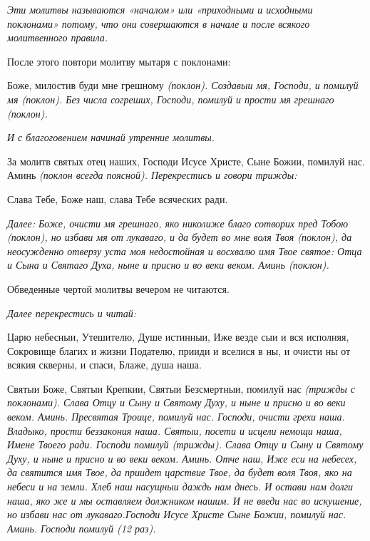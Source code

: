 \itshape Эти молитвы называются «началом» или «приходными и исходными поклонами» потому, что они совершаются в начале и после всякого молитвенного правила.\normalfont{}


После этого повтори молитву мытаря с поклонами:


Боже, милостив буди мне грешному \itshape (поклон)\normalfont{}. Создавыи мя, Господи, и помилуй мя \itshape (поклон)\normalfont{}. Без числа согреших, Господи, помилуй и прости мя грешнаго \itshape (поклон)\normalfont{}. 


\medskip


\itshape И с благоговением начинай утренние молитвы.\normalfont{}


\medskip


За молитв святых отец наших, Господи Исусе Христе, Сыне Божии, помилуй нас. Аминь \itshape (поклон всегда поясной). Перекрестись и говори трижды:\normalfont{}


Слава Тебе, Боже наш, слава Тебе всяческих ради. 


\medskip


\itshape Далее:\normalfont{} Боже, очисти мя грешнаго, яко николиже благо сотворих пред Тобою \itshape (поклон)\normalfont{}, но избави мя от лукаваго, и да будет во мне воля Твоя \itshape (поклон)\normalfont{}, да неосужденно отверзу уста моя недостойная и восхвалю имя Твое святое: Отца и Сына и Святаго Духа, ныне и присно и во веки веком. Аминь \itshape (поклон).

 Обведенные чертой молитвы вечером не читаются.\normalfont{} 


\medskip


\itshape Далее перекрестись и читай: \normalfont{}


Царю небесныи, Утешителю, Душе истинныи, Иже везде сыи и вся исполняя, Сокровище благих и жизни Подателю, прииди и вселися в ны, и очисти ны от всякия скверны, и спаси, Блаже, душа наша.


Святыи Боже, Святыи Крепкии, Святыи Безсмертныи, помилуй нас \itshape (трижды с поклонами)\normalfont{}. Слава Отцу и Сыну и Святому Духу, и ныне и присно и во веки веком. Аминь. Пресвятая Троице, помилуй нас. Господи, очисти грехи наша. Владыко, прости беззакония наша. Святыи, посети и исцели немощи наша, Имене Твоего ради. Господи помилуй (трижды). Слава Отцу и Сыну и Святому Духу, и ныне и присно и во веки веком. Аминь. Отче наш, Иже еси на небесех, да святится имя Твое, да приидет царствие Твое, да будет воля Твоя, яко на небеси и на земли. Хлеб наш насущныи даждь нам днесь. И остави нам долги наша, яко же и мы оставляем должником нашим. И не введи нас во искушение, но избави нас от лукаваго.Господи Исусе Христе Сыне Божии, помилуй нас. Аминь. Господи помилуй \itshape (12 раз)\normalfont{}. 


